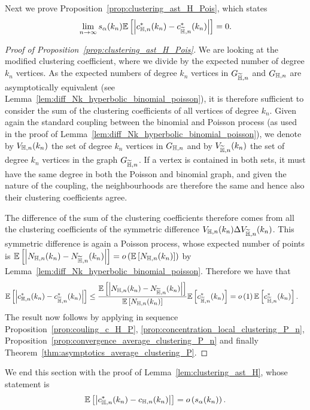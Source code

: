 Next we prove Proposition~\ref{prop:clustering_ast_H_Pois}, which states
\[
	\lim_{n \to \infty} s_\alpha(k_n)\mathbb{E}\left[\left|c_{\mathbb{H},n}^\ast(k_n) - c_{\widetilde{\mathbb{H}},n}^\ast(k_n)\right|\right] = 0.
\]

\begin{proof}[Proof of Proposition~\ref{prop:clustering_ast_H_Pois}]
We are looking at the modified clustering coefficient, where we divide by the expected number of degree $k_n$ vertices. As the expected numbers of degree $k_n$ vertices in $G_{\widetilde{\mathbb{H}},n}$ and $G_{\mathbb{H},n}$ are asymptotically equivalent (see Lemma~\ref{lem:diff_Nk_hyperbolic_binomial_poisson}), it is therefore sufficient to consider the sum of the clustering coefficients of all vertices of degree $k_n$.
Given again the standard coupling between the binomial and Poisson process (as used in the proof of Lemma~\ref{lem:diff_Nk_hyperbolic_binomial_poisson}), we denote by $V_{\mathbb{H},n}(k_n)$ the set of degree $k_n$ vertices in $G_{\mathbb{H},n}$ and by $V_{\widetilde{\mathbb{H}},n}(k_n)$ the set of degree $k_n$ vertices in the graph $G_{\widetilde{\mathbb{H}},n}$. If a vertex is contained in both sets, it must have the same degree in both the Poisson and binomial graph, and given the nature of the coupling, the neighbourhoods are therefore the same and hence also their clustering coefficients agree.

The difference of the sum of the clustering coefficients therefore comes from all the clustering coefficients of the symmetric difference $V_{\mathbb{H},n}(k_n) \Delta V_{\widetilde{\mathbb{H}},n}(k_n)$. This symmetric difference is again a Poisson process, whose expected number of points is $\mathbb{E}\left[\left|N_{\mathbb{H},n}(k_n) - N_{\widetilde{\mathbb{H}},n}(k_n)\right|\right] = o\left(\mathbb{E}\left[N_{\mathbb{H},n}(k_n)\right]\right)$ by Lemma~\ref{lem:diff_Nk_hyperbolic_binomial_poisson}. Therefore we have that
\begin{align*}
	\mathbb{E}\left[\left|c_{\mathbb{H},n}^\ast(k_n) - c_{\widetilde{\mathbb{H}},n}^\ast(k_n)\right|\right]
	&\le \frac{\mathbb{E}\left[\left|N_{\mathbb{H},n}(k_n)-N_{\widetilde{\mathbb{H}},n}(k_n)\right|\right]}{\mathbb{E}\left[N_{\mathbb{H},n}(k_n)\right]} \mathbb{E}\left[c_{\widetilde{\mathbb{H}},n}^\ast(k_n)\right]
	= o\left(1\right)\mathbb{E}\left[c_{\widetilde{\mathbb{H}},n}^\ast(k_n)\right].
\end{align*}
The result now follows by applying in sequence Proposition~\ref{prop:couling_c_H_P}, \ref{prop:concentration_local_clustering_P_n}, Proposition~\ref{prop:convergence_average_clustering_P_n} and finally Theorem~\ref{thm:asymptotics_average_clustering_P}.
\end{proof}

We end this section with the proof of Lemma~\ref{lem:clustering_ast_H}, whose statement is
\[
	\mathbb{E}\left[\left|c_{\mathbb{H}, n}^\ast(k_n) - c_{\mathbb{H}, n}(k_n)\right|\right] = o\left(s_\alpha(k_n)\right).
\]

